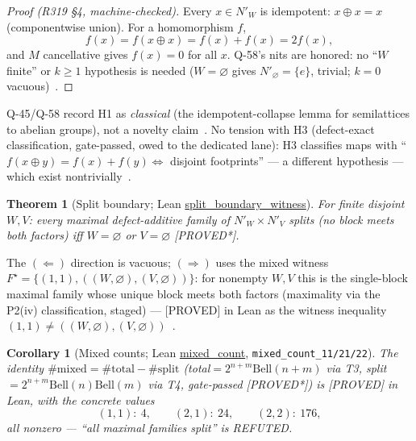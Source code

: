 \documentclass[11pt,a4paper]{article}
\newtheorem{theorem}{Theorem}
\newtheorem{corollary}{Corollary}
\theoremstyle{definition}
\begin{document}
\begin{proof}[Proof (R319 §4, machine-checked)]
Every $x\in N'_W$ is idempotent: $x\oplus x=x$ (componentwise union).
For a homomorphism $f$,
\begin{equation}
  \label{eq:h1}
  f(x)=f(x\oplus x)=f(x)+f(x)=2f(x),
\end{equation}
and $M$ cancellative gives $f(x)=0$ for all $x$. Q-58's nits are
honored: no ``$W$ finite'' or $k\ge1$ hypothesis is needed ($W=\varnothing$
gives $N'_\varnothing=\{e\}$, trivial; $k=0$ vacuous)~\cite{D319,D322}.
\end{proof}

Q-45/Q-58 record H1 as \emph{classical} (the idempotent-collapse lemma
for semilattices to abelian groups), not a novelty claim~\cite{D291,D322}.
No tension with H3 (defect-exact classification, gate-passed, owed to
the dedicated lane): H3 classifies maps with
``$f(x\oplus y)=f(x)+f(y)\iff$ disjoint footprints'' — a different
hypothesis — which exist nontrivially~\cite{D319}.

\begin{theorem}[Split boundary; Lean \url{split_boundary_witness}]
  \label{thm:c1}
  For finite disjoint $W,V$: every maximal defect-additive family of
  $N'_W\times N'_V$ splits (no block meets both factors) iff $W=\varnothing$
  or $V=\varnothing$ [PROVED*].
\end{theorem}

The $(\Leftarrow)$ direction is vacuous; $(\Rightarrow)$ uses the mixed
witness $F^\star=\{(1,1),((W,\varnothing),(V,\varnothing))\}$: for
nonempty $W,V$ this is the single-block maximal family whose unique
block meets both factors (maximality via the P2(iv) classification,
staged) — [PROVED] in Lean as the witness inequality
$(1,1)\ne((W,\varnothing),(V,\varnothing))$~\cite{D319,D322}.

\begin{corollary}[Mixed counts; Lean \url{mixed_count},
  \texttt{mixed\_count\_11/21/22}]
  \label{cor:c2}
  The identity $\#\mathrm{mixed}=\#\mathrm{total}-\#\mathrm{split}$
  (total$=2^{n+m}\mathrm{Bell}(n+m)$ via T3, split$=2^{n+m}
  \mathrm{Bell}(n)\mathrm{Bell}(m)$ via T4, gate-passed [PROVED*]) is
  [PROVED] in Lean, with the concrete values
  \begin{equation}
    \label{eq:mixedcount}
    (1,1){:}\ 4,\qquad (2,1){:}\ 24,\qquad (2,2){:}\ 176,
  \end{equation}
  all nonzero — ``all maximal families split'' is REFUTED.
\end{corollary}
\end{document}
